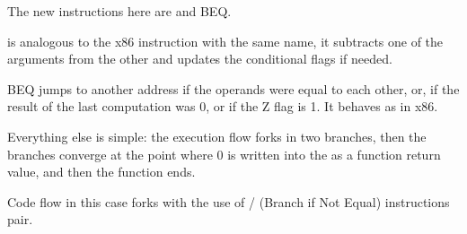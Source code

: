 




The new instructions here are \CMP and \ac{BEQ}.

\CMP is analogous to the x86 instruction with the same name, it subtracts one of the arguments from the other and updates the conditional flags if needed.

\ac{BEQ} jumps to another address if the operands were equal to each other, or,
if the result of the last computation was 0, or if the Z flag is 1.
It behaves as \JZ in x86.

Everything else is simple: the execution flow forks in two branches, then the branches
converge at the point where 0 is written into the  as a function return value, and then the function ends.




Code flow in this case forks with the use of / (Branch if Not Equal) instructions pair.

